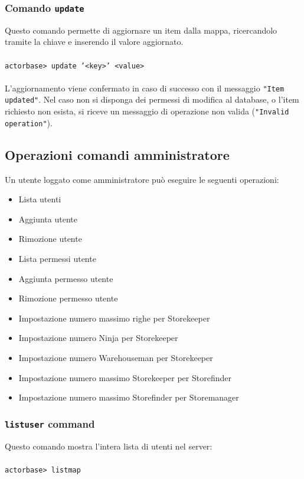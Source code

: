 \documentclass[a4paper]{article}
\begin{document}
	\subsubsection{Comando \texttt{update}}
	Questo comando permette di aggiornare un item dalla mappa, ricercandolo tramite la chiave e inserendo il valore aggiornato.
	\\ \\
	\texttt{actorbase>	update '<key>' <value>}
	\\ \\
	L'aggiornamento viene confermato in caso di successo con il messaggio \texttt{"Item updated"}. Nel caso non si disponga dei permessi di modifica al database, o l'item 
	richiesto non esista, si riceve un messaggio di operazione non valida (\texttt{"Invalid operation"}).
	
	\subsection{Operazioni comandi amministratore}
	Un utente loggato come amministratore può eseguire le seguenti operazioni:
	\begin{itemize}
		\item Lista utenti
		\item Aggiunta utente
		\item Rimozione utente
		\item Lista permessi utente
		\item Aggiunta permesso utente
		\item Rimozione permesso utente
		\item Impostazione numero massimo righe per Storekeeper
		\item Impostazione numero Ninja per Storekeeper
		\item Impostazione numero Warehouseman per Storekeeper
		\item Impostazione numero massimo Storekeeper per Storefinder
		\item Impostazione numero massimo Storefinder per Storemanager
	\end{itemize}

	\subsubsection{\texttt{listuser} command}
	Questo comando mostra l'intera lista di utenti nel server:
	\\ \\
	\texttt{actorbase>	listmap}
\end{document}
